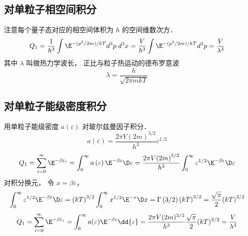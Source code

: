 \subsection{对单粒子相空间积分}
注意每个量子态对应的相空间体积为 $h$ 的空间维数次方．
\begin{equation}
{Q_1} = \frac{1}{h^3}\int {{\E^{ - ({p^2}/2m)/kT}}{d^3}p\;{d^3}x}  = \frac{V}{h^3}\int {{\E^{ - ({p^2}/2m)/kT}}{d^3}p}  = \frac{V}{\lambda ^3}
\end{equation}
其中 $\lambda $ 叫做热力学波长， 正比与粒子热运动的德布罗意波
\begin{equation}
\lambda  = \frac{h}{\sqrt {2\pi mkT} }
\end{equation}

\subsection{对单粒子能级密度积分}
用单粒子能级密度 $a\left( \varepsilon  \right)$ 对玻尔兹曼因子积分．
\begin{equation}
a\left( \varepsilon  \right) = \frac{2\pi V{{\left( {2m} \right)}^{3/2}}}{h^3}{\varepsilon ^{1/2}}
\end{equation}
\begin{equation}
{Q_1} = \sum\limits_{i = 0}^\infty  {\E^{ - \beta {\varepsilon_i}}}  = \int_0^\infty  {a\left( \varepsilon  \right){\E^{ - \beta \varepsilon }}\D \varepsilon }  \\
= \frac{2\pi V{{\left( {2m} \right)}^{3/2}}}{h^3}\int_0^\infty  {{\varepsilon ^{1/2}}{\E^{ - \beta \varepsilon }}\D \varepsilon }
\end{equation}
对积分换元， 令 $x = \beta \varepsilon $， 
\begin{equation}
\int_0^\infty  {{\varepsilon ^{1/2}}{\E^{ - \beta \varepsilon }}\D \varepsilon } = {\left( {kT} \right)^{3/2}}\int_0^\infty  {{x^{1/2}}{\E^{ - x}}\D x}
= \Gamma \left( {3/2} \right){\left( {kT} \right)^{3/2}}
= \frac{\sqrt \pi  }{2}{\left( {kT} \right)^{3/2}}
\end{equation}
\begin{equation}
Q_1 = \sum_{i = 0}^\infty \E^{-\beta \varepsilon_i}  = \int_0^\infty  a (\varepsilon) \E^{ - \beta \varepsilon} \dd{\varepsilon}  = \frac{2\pi V (2m)^{3/2}}{h^3} \frac{\sqrt \pi}{2} (kT)^{3/2}  = \frac{V}{\lambda^3}
\end{equation}

